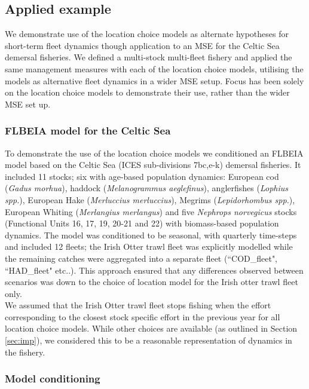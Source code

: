 \documentclass[12pt, halfline, a4paper]{ouparticle}
\begin{document}
\subsection{Applied example}

We demonstrate use of the location choice models as alternate hypotheses for
short-term fleet dynamics though application to an MSE for the Celtic Sea
demersal fisheries. We defined a multi-stock multi-fleet fishery and applied
the same management measures with each of the location choice models, utilising
the models as alternative fleet dynamics in a wider MSE setup. Focus has been
solely on the location choice models to demonstrate their use, rather than the
wider MSE set up.

\subsubsection{FLBEIA model for the Celtic Sea}

To demonstrate the use of the location choice models we conditioned an FLBEIA
model based on the Celtic Sea (ICES sub-divisions 7bc,e-k) demersal fisheries.
It included 11 stocks; six with age-based population dynamics: European cod
(\textit{Gadus morhua}), haddock (\textit{Melanogrammus aeglefinus}),
anglerfishes (\textit{Lophius spp.}), European Hake (\textit{Merluccius
	merluccius}), Megrims (\textit{Lepidorhombus spp.}), European Whiting
(\textit{Merlangius merlangus}) and five \textit{Nephrops norvegicus} stocks
(Functional Units 16, 17, 19, 20-21 and 22) with biomass-based population
dynamics. The model was conditioned to be seasonal, with quarterly time-steps
and included 12 fleets; the Irish Otter trawl fleet was explicitly modelled
while the remaining catches were aggregated into a separate fleet
(``COD\_fleet", ``HAD\_fleet" etc..). This approach ensured that any
differences observed between scenarios was down to the choice of location model
for the Irish otter trawl fleet only. \\

We assumed that the Irish Otter trawl fleet stops fishing when the effort
corresponding to the closest stock specific effort in the previous year for all
location choice models. While other choices are available (as outlined in
Section \ref{sec:imp}), we considered this to be a reasonable representation of
dynamics in the fishery. 

\subsubsection{Model conditioning}
\end{document}
